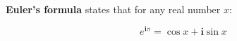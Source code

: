 \textbf{Euler's formula} states that for any real number $x$:

\[ e^{\displaystyle{\bm{i}\pi}} = \cos{x} + \bm{i} \sin{x} \]